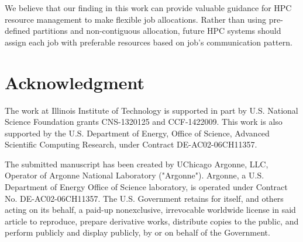\documentclass[conference]{IEEEtran}
\begin{document}
We believe that our finding in this work can provide valuable guidance for HPC resource management to make flexible job allocations. Rather than using pre-defined partitions and non-contiguous allocation, future HPC systems should assign each job with preferable resources based on job's communication pattern. 

\section*{Acknowledgment}
\label{sec: ack}
The work at Illinois Institute of Technology is supported in part by U.S. National Science Foundation grants CNS-1320125 and CCF-1422009. This work is also supported by the U.S. Department of Energy, Office of Science, Advanced Scientific Computing Research, under Contract DE-AC02-06CH11357.


  


\vspace{5\baselineskip}

\begin{framed}
The submitted manuscript has been created by UChicago Argonne, LLC, Operator of Argonne National Laboratory ("Argonne").  Argonne, a U.S. Department of Energy Office of Science laboratory, is operated under Contract No. DE-AC02-06CH11357.  The U.S. Government retains for itself, and others acting on its behalf, a paid-up nonexclusive, irrevocable worldwide license in said article to reproduce, prepare derivative works, distribute copies to the public, and perform publicly and display publicly, by or on behalf of the Government.
\end{framed}
\end{document}
